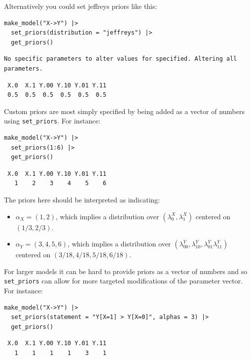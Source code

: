 \documentclass[
  article]{jss}
\providecommand{\tightlist}{%
  \setlength{\itemsep}{0pt}\setlength{\parskip}{0pt}}\usepackage{longtable,booktabs,array}
\begin{document}
Alternatively you could set jeffreys priors like this:

\begin{verbatim}
make_model("X->Y") |> 
  set_priors(distribution = "jeffreys") |> 
  get_priors()
\end{verbatim}

\begin{verbatim}
No specific parameters to alter values for specified. Altering all parameters.
\end{verbatim}

\begin{verbatim}
 X.0  X.1 Y.00 Y.10 Y.01 Y.11 
 0.5  0.5  0.5  0.5  0.5  0.5 
\end{verbatim}

Custom priors are most simply specified by being added as a vector of
numbers using \texttt{set\_priors}. For instance:

\begin{verbatim}
make_model("X->Y") |> 
  set_priors(1:6) |> 
  get_priors()
\end{verbatim}

\begin{verbatim}
 X.0  X.1 Y.00 Y.10 Y.01 Y.11 
   1    2    3    4    5    6 
\end{verbatim}

The priors here should be interpreted as indicating:

\begin{itemize}
\tightlist
\item
  \(\alpha_X = (1,2)\), which implies a distribution over
  \((\lambda^X_0, \lambda^X_1)\) centered on \((1/3, 2/3)\).
\item
  \(\alpha_Y = (3,4,5,6)\), which implies a distribution over
  \((\lambda^Y_{00}, \lambda^Y_{10}, \lambda^Y_{01} \lambda^Y_{11})\)
  centered on \((3/18, 4/18, 5/18, 6/18)\).
\end{itemize}

For larger models it can be hard to provide priors as a vector of
numbers and so \texttt{set\_priors} can allow for more targeted
modifications of the parameter vector. For instance:

\begin{verbatim}
make_model("X->Y") |>
  set_priors(statement = "Y[X=1] > Y[X=0]", alphas = 3) |>
  get_priors()
\end{verbatim}

\begin{verbatim}
 X.0  X.1 Y.00 Y.10 Y.01 Y.11 
   1    1    1    1    3    1 
\end{verbatim}
\end{document}
